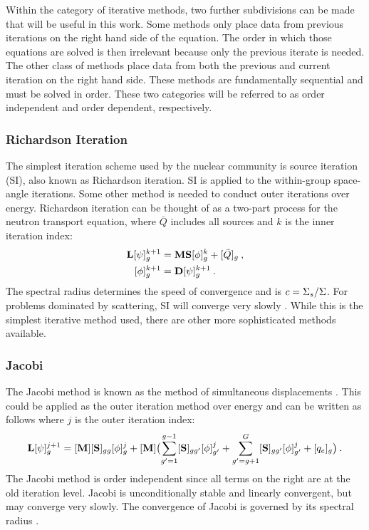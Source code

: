 Within the category of iterative methods, two further subdivisions can be made that will be useful in this work. Some methods only place data from previous iterations on the right hand side of the equation. The order in which those equations are solved is then irrelevant because only the previous iterate is needed. The other class of methods place data from both the previous and current iteration on the right hand side. These methods are fundamentally sequential and must be solved in order. These two categories will be referred to as order independent and order dependent, respectively. 

\subsubsection{Richardson Iteration}
The simplest iteration scheme used by the nuclear community is source iteration (SI), also known as Richardson iteration. SI is applied to the within-group space-angle iterations. Some other method is needed to conduct outer iterations over energy. Richardson iteration can be thought of as a two-part process for the neutron transport equation, where $\bar{Q}$ includes all sources and $k$ is the inner iteration index:
%
\begin{align}
  \mathbf{L}[\psi]_g^{k+1} &= \mathbf{MS} [\phi]_g^k + [\bar{Q}]_{g} \:,   \label{eq:SIpsi} \\
  [\phi]_g^{k+1} &= \mathbf{D}[\psi]_g^{k+1} \:.
  \label{eq:SIphi}
\end{align}
%
The spectral radius determines the speed of convergence and is $c = \Sigma_s / \Sigma$. For problems dominated by scattering, SI will converge very slowly \cite{Evans2009d}. While this is the simplest iterative method used, there are other more sophisticated methods available. 

\subsubsection{Jacobi}
The Jacobi method is known as the method of simultaneous displacements \cite{LeVeque2007}. This could be applied as the outer iteration method over energy and can be written as follows where $j$ is the outer iteration index:
%
\begin{equation}
  \mathbf{L} [\psi]_{g}^{j+1} = [\mathbf{M}] [\mathbf{S}]_{gg}[\phi]_{g}^{j} +   [\mathbf{M}]\bigl(\sum_{g'=1}^{g-1} [\mathbf{S}]_{gg'}[\phi]_{g'}^{j} + \sum_{g'=g+1}^{G} [\mathbf{S}]_{gg'}[\phi]_{g'}^{j} + [q_{e}]_{g} \bigr) \label{eq:Jacobi} \:. 
\end{equation}
%
The Jacobi method is order independent since all terms on the right are at the old iteration level. Jacobi is unconditionally stable and linearly convergent, but may converge very slowly. The convergence of Jacobi is governed by its spectral radius \cite{LeVeque2007}. 

